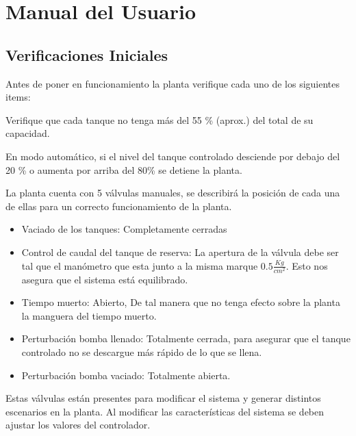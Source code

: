 \chapter{Manual del Usuario}
\label{anexo:manualUsuario}


\section{Verificaciones Iniciales}
\label{anexo:verificaciones}
Antes de poner en funcionamiento la planta verifique cada uno de los siguientes 
items:

\begin{tcolorbox}[title=Nivel de agua]
Verifique que cada tanque no tenga más del 55 \% (aprox.) del total de su 
capacidad. 
\end {tcolorbox}
\begin{lattention}
En modo automático, si el nivel del tanque controlado desciende por debajo del 
20 \% o aumenta por arriba del 80\% se detiene la planta. 
\end{lattention}



\begin{tcolorbox}[title=Válvulas manuales, breakable]
La planta cuenta con 5 válvulas manuales, se describirá la posición de cada una 
de ellas para un correcto funcionamiento de la planta. 
 
 \begin{itemize}
  \item Vaciado de los tanques: Completamente cerradas
  \item Control de caudal del tanque de reserva:
  La apertura de la válvula debe ser tal que el manómetro que esta junto
  a la misma marque $0.5\frac{Kg}{cm^2}$. Esto nos asegura que el sistema está 
  equilibrado.
  \item Tiempo muerto: Abierto, De tal manera que no tenga efecto sobre la 
  planta la manguera del tiempo muerto.
  \item Perturbación bomba llenado: Totalmente cerrada, para asegurar que el 
  tanque controlado no se descargue más rápido de lo que se llena.
  \item Perturbación bomba vaciado: Totalmente abierta.
 \end{itemize}
 \tcblower
 Estas válvulas están presentes para modificar el sistema y generar distintos 
escenarios en la planta. Al modificar las características del sistema se deben 
ajustar los valores del controlador.
\end {tcolorbox}


